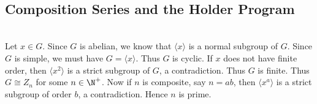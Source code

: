 \documentclass[a4paper]{article}
\begin{document}
\begin{ex}{}{}
\end{ex} 

\begin{ex}{}{}
\end{ex} 

\begin{ex}{}{}
\end{ex} 

\begin{ex}{}{}
\end{ex} 

\begin{ex}{}{}
\end{ex} 

\begin{ex}{}{}
\end{ex} 

\begin{ex}{}{}
\end{ex} 

\begin{ex}{}{}
\end{ex} 

\begin{ex}{}{}
\end{ex} 

\begin{ex}{}{}
\end{ex} 

\begin{ex}{}{}
\end{ex} 

\begin{ex}{}{}\\

\end{ex} 

\subsection{}
\subsection{Composition Series and the Holder Program}
\begin{ex}{}{}\\
Let $x\in G$. Since $G$ is abelian, we know that $\langle x\rangle$ is a normal subgroup of $G$. Since $G$ is simple, we must have $G=\langle x\rangle$. Thus $G$ is cyclic. If $x$ does not have finite order, then $\langle x^2\rangle$ is a strict subgroup of $G$, a contradiction. Thus $G$ is finite. Thus $G\cong Z_n$ for some $n\in\N^+$. Now if $n$ is composite, say $n=ab$, then $\langle x^a\rangle$ is a strict subgroup of order $b$, a contradiction. Hence $n$ is prime. 
\end{ex} 

\begin{ex}{}{}\\

\end{ex} 
 
\end{document}
